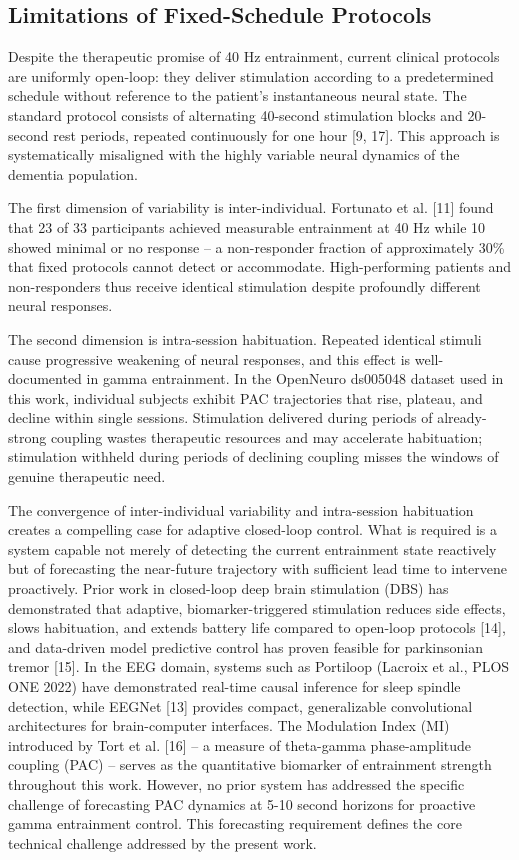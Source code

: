 \documentclass[11pt,letterpaper]{article}
\begin{document}
\subsection{Limitations of Fixed-Schedule Protocols}

Despite the therapeutic promise of 40 Hz entrainment, current clinical protocols are uniformly open-loop: they deliver stimulation according to a predetermined schedule without reference to the patient's instantaneous neural state. The standard protocol consists of alternating 40-second stimulation blocks and 20-second rest periods, repeated continuously for one hour [9, 17]. This approach is systematically misaligned with the highly variable neural dynamics of the dementia population.

The first dimension of variability is inter-individual. Fortunato et al. [11] found that 23 of 33 participants achieved measurable entrainment at 40 Hz while 10 showed minimal or no response -- a non-responder fraction of approximately 30\% that fixed protocols cannot detect or accommodate. High-performing patients and non-responders thus receive identical stimulation despite profoundly different neural responses.

The second dimension is intra-session habituation. Repeated identical stimuli cause progressive weakening of neural responses, and this effect is well-documented in gamma entrainment. In the OpenNeuro ds005048 dataset used in this work, individual subjects exhibit PAC trajectories that rise, plateau, and decline within single sessions. Stimulation delivered during periods of already-strong coupling wastes therapeutic resources and may accelerate habituation; stimulation withheld during periods of declining coupling misses the windows of genuine therapeutic need.

The convergence of inter-individual variability and intra-session habituation creates a compelling case for adaptive closed-loop control. What is required is a system capable not merely of detecting the current entrainment state reactively but of forecasting the near-future trajectory with sufficient lead time to intervene proactively. Prior work in closed-loop deep brain stimulation (DBS) has demonstrated that adaptive, biomarker-triggered stimulation reduces side effects, slows habituation, and extends battery life compared to open-loop protocols [14], and data-driven model predictive control has proven feasible for parkinsonian tremor [15]. In the EEG domain, systems such as Portiloop (Lacroix et al., PLOS ONE 2022) have demonstrated real-time causal inference for sleep spindle detection, while EEGNet [13] provides compact, generalizable convolutional architectures for brain-computer interfaces. The Modulation Index (MI) introduced by Tort et al. [16] -- a measure of theta-gamma phase-amplitude coupling (PAC) -- serves as the quantitative biomarker of entrainment strength throughout this work. However, no prior system has addressed the specific challenge of forecasting PAC dynamics at 5-10 second horizons for proactive gamma entrainment control. This forecasting requirement defines the core technical challenge addressed by the present work.
\end{document}
